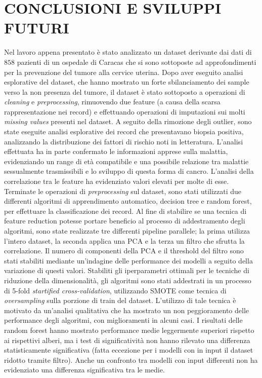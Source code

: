 \section{CONCLUSIONI E SVILUPPI FUTURI}
Nel lavoro appena presentato è stato analizzato un dataset derivante dai dati di $858$ pazienti di un ospedale di Caracas che si sono sottoposte ad approfondimenti per la prevenzione del tumore alla cervice uterina.
Dopo aver eseguito analisi esplorative del dataset, che hanno mostrato un forte sbilanciamento dei sample verso la non presenza del tumore, il dataset è stato sottoposto a operazioni di \textit{cleaning} e \textit{preprocessing}, rimuovendo due feature (a causa della scarsa rappresentazione nei record) e effettuando operazioni di imputazioni sui molti \textit{missing values} presenti nel dataset.
A seguito della rimozione degli outlier, sono state eseguite analisi esplorative dei record che presentavano biopsia positiva, analizzando la distribuzione dei fattori di rischio noti in letteratura.
L'analisi effettuata ha in parte confermato le informazioni apprese sulla malattia, evidenziando un range di età compatibile e una possibile relazione tra malattie sessualmente trasmissibili e lo sviluppo di questa forma di cancro.
L'analisi della correlazione tra le feature ha evidenziato valori elevati per molte di esse.\\
Terminate le operazioni di \textit{preprocessing} sul dataset, sono stati utilizzati due differenti algoritmi di apprendimento automatico, decision tree e random forest, per effettuare la classificazione dei record.
Al fine di stabilire se una tecnica di feature reduction potesse portare beneficio al processo di addestramento degli algoritmi, sono state realizzate tre differenti pipeline parallele; la prima utilizza l'intero dataset, la seconda applica una PCA e la terza un filtro che sfrutta la correlazione.
Il numero di componenti della PCA e il threshold del filtro sono stati stabiliti mediante un'indagine delle performance dei modelli a seguito della variazione di questi valori.
Stabiliti gli iperparametri ottimali per le tecniche di riduzione della dimensionalità, gli algoritmi sono stati addestrati in un processo di 5-fold \textit{startified cross-validation}, utilizzando SMOTE come tecnica di \textit{oversampling} sulla porzione di train del dataset.
L'utilizzo di tale tecnica è motivato da un'analisi qualitativa che ha mostrato un non peggioramento delle performance degli algoritmi, con miglioramenti in alcuni casi.
I risultati delle random forest hanno mostrato performance medie leggermente superiori rispetto ai rispettivi alberi, ma i test di significatività non hanno rilevato una differenza statisticamente significativa (fatta eccezione per i modelli con in input il dataset ridotto tramite filtro). Anche un confronto tra modelli con input differenti non ha evidenziato una differenza significativa tra le medie.

